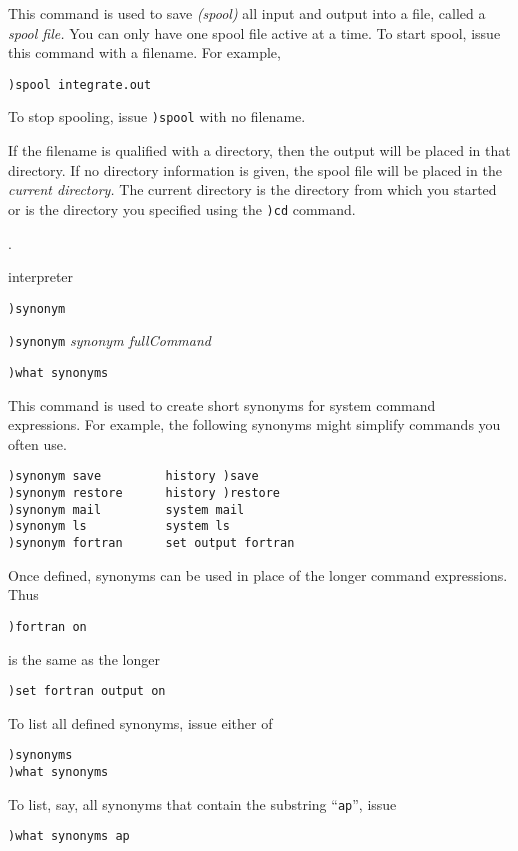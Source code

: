 {{{{{{{\par{}

This command is used to save {\it (spool)} all \Language{} input and output
into a file, called a {\it spool file.}
You can only have one spool file active at a time.
To start spool, issue this command with a filename. For example,
\begin{verbatim}
)spool integrate.out
\end{verbatim}
To stop spooling, issue {\tt )spool} with no filename.

If the filename is qualified with a directory, then the output will
be placed in that directory.
If no directory information is given, the spool file will be placed in the
{\it current directory.}
The current directory is the directory from which you started
\Language{} or is the directory you specified using the
{\tt )cd} command.

\par{}
.




\par{} interpreter

\par{}
\begin{simpleList}
\item{\tt )synonym}
\item{\tt )synonym} {\it synonym fullCommand}
\item{\tt )what synonyms}
\end{simpleList}

\par{}

This command is used to create short synonyms for system command expressions.
For example, the following synonyms  might simplify commands you often
use.
\begin{verbatim}
)synonym save         history )save
)synonym restore      history )restore
)synonym mail         system mail
)synonym ls           system ls
)synonym fortran      set output fortran
\end{verbatim}
Once defined, synonyms can be
used in place of the longer  command expressions.
Thus
\begin{verbatim}
)fortran on
\end{verbatim}
is the same as the longer
\begin{verbatim}
)set fortran output on
\end{verbatim}
To list all defined synonyms, issue either of
\begin{verbatim}
)synonyms
)what synonyms
\end{verbatim}
To list, say, all synonyms that contain the substring
``{\tt ap}'', issue
\begin{verbatim}
)what synonyms ap
\end{verbatim}

}}}}}}}
